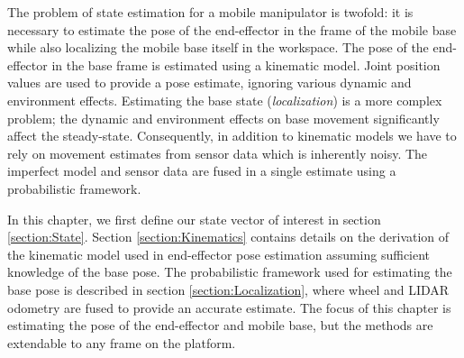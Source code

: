 \documentclass[times, utf8, diplomski, english]{fer}
\begin{document}
The problem of state estimation for a mobile manipulator is twofold: it is necessary to estimate the pose of the end-effector in the frame of the mobile base while also localizing the mobile base itself in the workspace.
The pose of the end-effector in the base frame is estimated using a kinematic model.
Joint position values are used to provide a pose estimate, ignoring various dynamic and environment effects.
Estimating the base state (\textit{localization}) is a more complex problem; the dynamic and environment effects on base movement significantly affect the steady-state.
Consequently, in addition to kinematic models we have to rely on movement estimates from sensor data which is inherently noisy.
The imperfect model and sensor data are fused in a single estimate using a probabilistic framework.

In this chapter, we first define our state vector of interest in section \ref{section:State}. 
Section \ref{section:Kinematics} contains details on the derivation of the kinematic model used in end-effector pose estimation assuming sufficient knowledge of the base pose. 
The probabilistic framework used for estimating the base pose is described in section \ref{section:Localization}, where wheel and LIDAR odometry are fused to provide an accurate estimate.
The focus of this chapter is estimating the pose of the end-effector and mobile base, but the methods are extendable to any frame on the platform.
\end{document}
